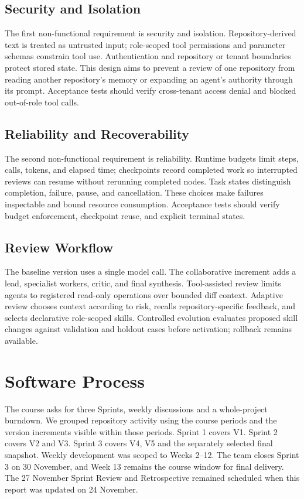 \documentclass[journal,compsoc]{IEEEtran}
\begin{document}
\subsection{Security and Isolation}
The first non-functional requirement is security and isolation. Repository-derived text is treated as untrusted input; role-scoped tool permissions and parameter schemas constrain tool use. Authentication and repository or tenant boundaries protect stored state. This design aims to prevent a review of one repository from reading another repository’s memory or expanding an agent’s authority through its prompt. Acceptance tests should verify cross-tenant access denial and blocked out-of-role tool calls.

\subsection{Reliability and Recoverability}
The second non-functional requirement is reliability. Runtime budgets limit steps, calls, tokens, and elapsed time; checkpoints record completed work so interrupted reviews can resume without rerunning completed nodes. Task states distinguish completion, failure, pause, and cancellation. These choices make failures inspectable and bound resource consumption. Acceptance tests should verify budget enforcement, checkpoint reuse, and explicit terminal states.

\subsection{Review Workflow}
The baseline version uses a single model call. The collaborative increment adds a lead, specialist workers, critic, and final synthesis. Tool-assisted review limits agents to registered read-only operations over bounded diff context. Adaptive review chooses context according to risk, recalls repository-specific feedback, and selects declarative role-scoped skills. Controlled evolution evaluates proposed skill changes against validation and holdout cases before activation; rollback remains available.


\section{Software Process}
The course asks for three Sprints, weekly discussions and a whole-project burndown. We grouped repository activity using the course periods and the version increments visible within those periods. Sprint 1 covers V1. Sprint 2 covers V2 and V3. Sprint 3 covers V4, V5 and the separately selected final snapshot. Weekly development was scoped to Weeks 2--12. The team closes Sprint 3 on 30 November, and Week 13 remains the course window for final delivery. The 27 November Sprint Review and Retrospective remained scheduled when this report was updated on 24 November.
\end{document}
